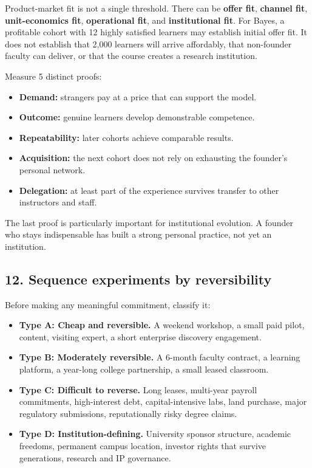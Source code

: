 Product-market fit is not a single threshold. There can be \textbf{offer fit}, \textbf{channel fit}, \textbf{unit-economics fit}, \textbf{operational fit}, and \textbf{institutional fit}. For Bayes, a profitable cohort with 12 highly satisfied learners may establish initial offer fit. It does not establish that 2,000 learners will arrive affordably, that non-founder faculty can deliver, or that the course creates a research institution.

Measure 5 distinct proofs:

\begin{itemize}[leftmargin=*,itemsep=1.5pt]
  \item \textbf{Demand:} strangers pay at a price that can support the model.
  \item \textbf{Outcome:} genuine learners develop demonstrable competence.
  \item \textbf{Repeatability:} later cohorts achieve comparable results.
  \item \textbf{Acquisition:} the next cohort does not rely on exhausting the founder's personal network.
  \item \textbf{Delegation:} at least part of the experience survives transfer to other instructors and staff.
\end{itemize}

The last proof is particularly important for institutional evolution. A founder who stays indispensable has built a strong personal practice, not yet an institution.

\subsection{12. Sequence experiments by reversibility}

Before making any meaningful commitment, classify it:

\begin{itemize}[leftmargin=*,itemsep=1.5pt]
  \item \textbf{Type A: Cheap and reversible.} A weekend workshop, a small paid pilot, content, visiting expert, a short enterprise discovery engagement.
  \item \textbf{Type B: Moderately reversible.} A 6-month faculty contract, a learning platform, a year-long college partnership, a small leased classroom.
  \item \textbf{Type C: Difficult to reverse.} Long leases, multi-year payroll commitments, high-interest debt, capital-intensive labs, land purchase, major regulatory submissions, reputationally risky degree claims.
  \item \textbf{Type D: Institution-defining.} University sponsor structure, academic freedoms, permanent campus location, investor rights that survive generations, research and IP governance.
\end{itemize}

